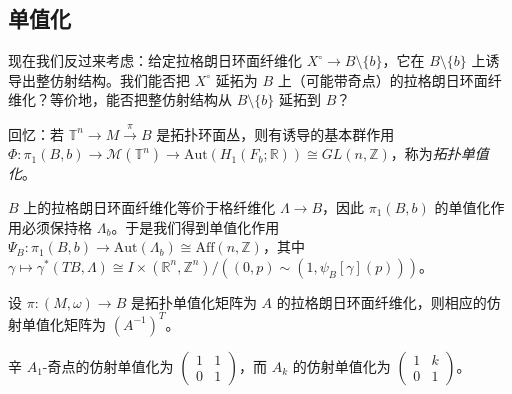 
\subsection{单值化}

现在我们反过来考虑：给定拉格朗日环面纤维化 $X^{\circ}\to B\setminus\{b\}$，它在 $B\setminus\{b\}$ 上诱导出整仿射结构。我们能否把 $X^{\circ}$ 延拓为 $B$ 上（可能带奇点）的拉格朗日环面纤维化？等价地，能否把整仿射结构从 $B\setminus\{b\}$ 延拓到 $B$？


回忆：若 $\mathbb{T}^n\to M\xrightarrow{\pi} B$ 是拓扑环面丛，则有诱导的基本群作用 $\Phi\colon\pi_1 (B,b)\to\mathcal{M} (\mathbb{T}^n)\to\mathrm{Aut} (H_1 (F_b;\mathbb{R}))\cong GL(n,\mathbb{Z})$，称为\emph{拓扑单值化}。


$B$ 上的拉格朗日环面纤维化等价于格纤维化 $\Lambda\to B$，因此 $\pi_1 (B,b)$ 的单值化作用必须保持格 $\Lambda_b$。于是我们得到单值化作用 $\Psi_B\colon\pi_1 (B,b)\to\mathrm{Aut} (\Lambda_b)\cong\mathrm{Aff} (n,\mathbb{Z})$，其中 $\gamma\mapsto\gamma^{\ast} (TB,\Lambda)\cong I\times (\mathbb{R}^n,\mathbb{Z}^n)\big/\left((0,p)\sim (1,\psi_B [\gamma](p))\right)$。


\begin{theorem*}
设 $\pi\colon (M,\omega)\to B$ 是拓扑单值化矩阵为 $A$ 的拉格朗日环面纤维化，则相应的仿射单值化矩阵为 $\left(A^{-1}\right)^T$。
\end{theorem*}

\begin{theorem*}
辛 $A_1$-奇点的仿射单值化为 $\begin{pmatrix}1&1\\0&1\end{pmatrix}$，而 $A_k$ 的仿射单值化为 $\begin{pmatrix}1&k\\0&1\end{pmatrix}$。
\end{theorem*}

